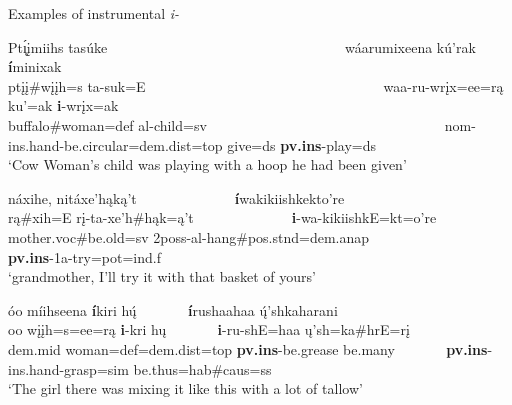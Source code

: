 \begin{exe}

\item\label{instrumentalexamples} Examples of instrumental \textit{i-}

	\begin{xlist}
	

	\item\label{instrumentalexamples1} \glll Pt\'{ı̨}įmiihs tasúke ~ ~ ~ ~ ~ ~ ~ ~ ~ ~ ~ ~ ~ ~ ~ ~ ~ ~ ~ ~ wáarumixeena kú'rak \textbf{í}minixak\\
	ptįį\#wįįh=s ta-suk=E ~ ~ ~ ~ ~ ~ ~ ~ ~ ~ ~ ~ ~ ~ ~ ~ ~ ~ ~ ~  waa-ru-wrįx=ee=rą ku'=ak \textbf{i}-wrįx=ak\\
	\textnormal{buffalo}\#\textnormal{woman}=def al-\textnormal{child}=sv ~ ~ ~ ~ ~ ~ ~ ~ ~ ~ ~ ~ ~ ~ ~ ~ ~ ~ ~ ~  nom-ins.hand-\textnormal{be.circular}=dem.dist=top \textnormal{give}=ds \textbf{pv.ins}-\textnormal{play}=ds\\
	\glt `Cow Woman's child was playing with a hoop he had been given' \citep[112]{hollow1973a}
	
	\item\label{instrumentalexamples2} \glll náxihe, nitáxe'hąką't ~ ~ ~ ~ ~ ~ ~ ~  \textbf{í}wakikiishkekto're\\
	rą\#xih=E rį-ta-xe'h\#hąk=ą't ~ ~ ~ ~ ~ ~ ~ ~ \textbf{i}-wa-kikiishkE=kt=o're\\ 
	\textnormal{mother}.voc\#\textnormal{be.old}=sv 2poss-al-\textnormal{hang}\#pos.stnd=dem.anap ~ ~ ~ ~ ~ ~ ~ ~ \textbf{pv.ins}-1a-\textnormal{try}=pot=ind.f\\
	\glt `grandmother, I'll try it with that basket of yours' \citep[148]{hollow1973a}
	
	\item\label{instrumentalexamples3} \glll %
	óo míihseena \textbf{í}kiri hų́ ~ ~ ~ ~ \textbf{í}rushaahaa ų́'shkaharani\\
	oo wįįh=s=ee=rą \textbf{i}-kri hų ~ ~ ~ ~ \textbf{i}-ru-shE=haa ų'sh=ka\#hrE=rį\\
	dem.mid \textnormal{woman}=def=dem.dist=top \textbf{pv.ins}-\textnormal{be.grease} \textnormal{be.many} ~ ~ ~ ~ \textbf{pv.ins}-ins.hand-\textnormal{grasp}=sim \textnormal{be.thus}=hab\#caus=ss\\
	\glt `The girl there was mixing it like this with a lot of tallow' \citep[208]{hollow1973b}
	

\end{xlist}
\end{exe}

